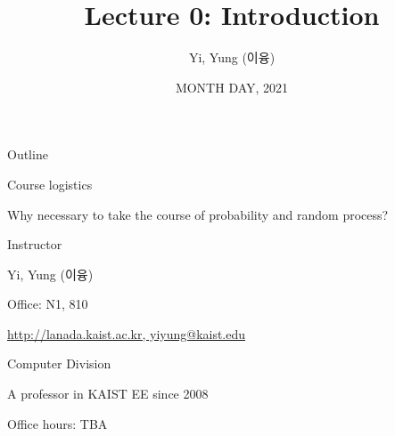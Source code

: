 \documentclass[fleqn,aspectratio=169]{beamer}
\title[]{Lecture 0: Introduction}
\author{Yi, Yung (이융)}
\institute{EE210: Probability and Introductory Random Processes\\ KAIST EE}
\date{MONTH DAY, 2021}
\begin{document}




\begin{frame}
  \titlepage
\end{frame}


\begin{frame}{Outline}

\bci
\item Course logistics

\item Why necessary to take the course of probability and random process?
\eci
\end{frame}


\begin{frame}{Instructor}

\bci
\item Yi, Yung (이융)
\item Office: N1, 810
\item \url{http://lanada.kaist.ac.kr, yiyung@kaist.edu}
\item Computer Division
\item A professor in KAIST EE since 2008

\medskip
\item Office hours: TBA

\eci

\end{frame}
\end{document}

